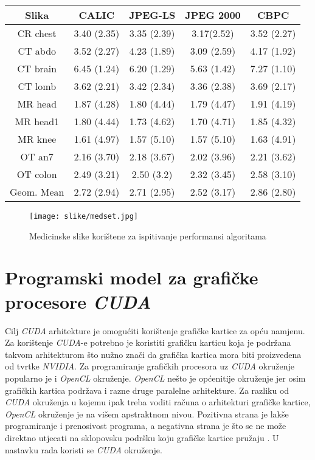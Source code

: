 \documentclass[times, utf8, zavrsni, numeric, sort]{fer}
\begin{document}
\begin{center}
 \label{tab:komp}
\begin{tabular}{| c | c | c | c | c |}
\hline
Slika & CALIC & JPEG-LS & JPEG 2000 & CBPC
\\
\hline
CR chest & 3.40 (2.35) & 3.35 (2.39) & 3.17(2.52) & 3.52 (2.27)
\\
\hline
CT abdo & 3.52 (2.27) & 4.23 (1.89) & 3.09 (2.59) & 4.17 (1.92)
\\
\hline
CT brain & 6.45 (1.24) & 6.20 (1.29) & 5.63 (1.42) & 7.27 (1.10)
\\
\hline
CT lomb & 3.62 (2.21) & 3.42 (2.34) & 3.36 (2.38) & 3.69 (2.17)
\\
\hline
MR head & 1.87 (4.28) & 1.80 (4.44) & 1.79 (4.47) & 1.91 (4.19)
\\
\hline
MR head1 & 1.80 (4.44) & 1.73 (4.62) & 1.70 (4.71) & 1.85 (4.32)
\\
\hline
MR knee & 1.61 (4.97) & 1.57 (5.10) & 1.57 (5.10) & 1.63 (4.91)
\\
\hline
OT an7 & 2.16 (3.70) & 2.18 (3.67) & 2.02 (3.96) & 2.21 (3.62)
\\
\hline
OT colon & 2.49 (3.21) & 2.50 (3.2) & 2.32 (3.45) & 2.58 (3.10)
\\
\hline
Geom. Mean & 2.72 (2.94) & 2.71 (2.95) & 2.52 (3.17) & 2.86 (2.80)
\\
\hline

\end{tabular}
\end{center}


\begin{figure}[htb]
\centering
\texttt{[image: slike/medset.jpg]}
\caption{Medicinske slike korištene za ispitivanje performansi algoritama}
\label{fig:med_slike}
\end{figure}



\chapter{Programski model za grafičke procesore \emph{CUDA}}
Cilj \emph{CUDA} arhitekture je omogućiti korištenje grafičke kartice za opću namjenu. Za korištenje \emph{CUDA}-e potrebno je koristiti grafičku karticu koja je podržana takvom arhitekturom što nužno znači da grafička kartica mora biti proizvedena od tvrtke \emph{NVIDIA}. Za programiranje grafičkih procesora uz \emph{CUDA} okruženje popularno je i \emph{OpenCL} okruženje. \emph{OpenCL} nešto je općenitije okruženje jer osim grafičkih kartica podržava i razne druge paralelne arhitekture. Za razliku od \emph{CUDA} okruženja u kojemu ipak treba voditi računa o arhitekturi grafičke kartice, \emph{OpenCL} okruženje je na višem apstraktnom nivou. Pozitivna strana je lakše programiranje i prenosivost programa, a negativna strana je što se ne može direktno utjecati na sklopovsku podršku koju grafičke kartice pružaju \cite{Gaster:2012}. U nastavku rada koristi se \emph{CUDA} okruženje.
\end{document}
